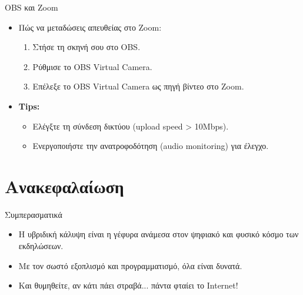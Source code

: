 \documentclass{beamer}
\begin{document}
\begin{frame}{OBS και Zoom}
  \begin{itemize}
  \item Πώς να μεταδώσεις απευθείας στο Zoom:
    \begin{enumerate}
    \item Στήσε τη σκηνή σου στο OBS.
    \item Ρύθμισε το OBS Virtual Camera.
    \item Επέλεξε το OBS Virtual Camera ως πηγή βίντεο στο Zoom.
    \end{enumerate}
  \item \textbf{Tips:}
    \begin{itemize}
    \item Ελέγξτε τη σύνδεση δικτύου (upload speed > 10Mbps).
    \item Ενεργοποιήστε την ανατροφοδότηση (audio monitoring) για έλεγχο.
    \end{itemize}
  \end{itemize}
\end{frame}

\section{Ανακεφαλαίωση}
\begin{frame}{Συμπερασματικά}
  \begin{itemize}
  \item Η υβριδική κάλυψη είναι η γέφυρα ανάμεσα στον ψηφιακό και φυσικό κόσμο των εκδηλώσεων.
  \item Με τον σωστό εξοπλισμό και προγραμματισμό, όλα είναι δυνατά.
  \item Και θυμηθείτε, αν κάτι πάει στραβά... πάντα φταίει το Internet!
  \end{itemize}
\end{frame}
\end{document}
